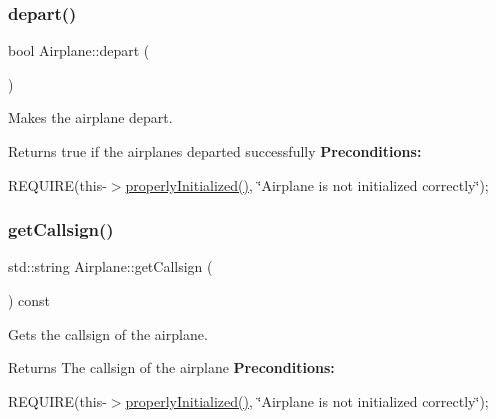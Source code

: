 \subsubsection{\texorpdfstring{depart()}{depart()}}
{\footnotesize\ttfamily bool Airplane\+::depart (\begin{DoxyParamCaption}{ }\end{DoxyParamCaption})}



Makes the airplane depart. 

\begin{DoxyReturn}{Returns}
true if the airplanes departed successfully {\bfseries Preconditions\+:}
\begin{DoxyItemize}
\item R\+E\+Q\+U\+I\+RE(this-\/$>$\mbox{\hyperlink{class_airplane_a6f80df8f692cc8d67d292c1e9f26d59e}{properly\+Initialized()}}, \char`\"{}\+Airplane is not initialized correctly\char`\"{}); 
\end{DoxyItemize}
\end{DoxyReturn}
\mbox{\label{class_airplane_af7e30dcc3191147869b0208edf7000c5}} 
\subsubsection{\texorpdfstring{get\+Callsign()}{getCallsign()}}
{\footnotesize\ttfamily std\+::string Airplane\+::get\+Callsign (\begin{DoxyParamCaption}{ }\end{DoxyParamCaption}) const}



Gets the callsign of the airplane. 

\begin{DoxyReturn}{Returns}
The callsign of the airplane {\bfseries Preconditions\+:}
\begin{DoxyItemize}
\item R\+E\+Q\+U\+I\+RE(this-\/$>$\mbox{\hyperlink{class_airplane_a6f80df8f692cc8d67d292c1e9f26d59e}{properly\+Initialized()}}, \char`\"{}\+Airplane is not initialized correctly\char`\"{}); 
\end{DoxyItemize}
\end{DoxyReturn}
\mbox{\label{class_airplane_aedac81e80b724d61d1c9df7311067ba8}} 
